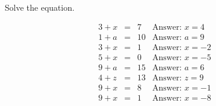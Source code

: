 \begin{frame}
\begin{example}
Solve the equation.

\[
\begin{array}{rcll}
3+x &=& 7& \text{Answer: }x=4\\
1+a &=& 10& \text{Answer: }a=9\\
3+x &=& 1& \text{Answer: }x=-2\\
5+x &=& 0& \text{Answer: }x=-5\\
9+a &=& 15& \text{Answer: }a=6\\
4+z &=& 13& \text{Answer: }z=9\\
9+x &=& 8& \text{Answer: }x=-1\\
9+x &=& 1& \text{Answer: }x=-8\\

\end{array}
\]
\end{example}


\end{frame}